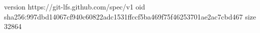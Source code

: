 version https://git-lfs.github.com/spec/v1
oid sha256:997dbd14067cf940c60822adc1531ffccf5ba469f75f46253701ae2ac7cbd467
size 32864
